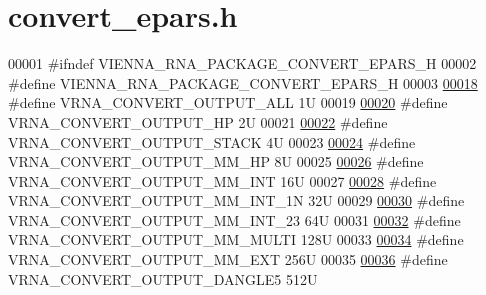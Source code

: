 \hypertarget{convert__epars_8h_source}{\section{convert\+\_\+epars.\+h}
\label{convert__epars_8h_source}
}

\begin{DoxyCode}
00001 \textcolor{preprocessor}{#ifndef VIENNA\_RNA\_PACKAGE\_CONVERT\_EPARS\_H}
00002 \textcolor{preprocessor}{#define VIENNA\_RNA\_PACKAGE\_CONVERT\_EPARS\_H}
00003 
\hypertarget{convert__epars_8h_source_l00018}{}\hyperlink{group__energy__parameters__convert_ga8dc6aee5a806c49b71557152f9616bc4}{00018} \textcolor{preprocessor}{#define VRNA\_CONVERT\_OUTPUT\_ALL           1U}
00019 
\hypertarget{convert__epars_8h_source_l00020}{}\hyperlink{group__energy__parameters__convert_gaf66fe2cb11dfcfd32d791049c254a8a4}{00020} \textcolor{preprocessor}{#define VRNA\_CONVERT\_OUTPUT\_HP            2U}
00021 
\hypertarget{convert__epars_8h_source_l00022}{}\hyperlink{group__energy__parameters__convert_gad23522d63f8d4c50d5a5deee9bee3ef2}{00022} \textcolor{preprocessor}{#define VRNA\_CONVERT\_OUTPUT\_STACK         4U}
00023 
\hypertarget{convert__epars_8h_source_l00024}{}\hyperlink{group__energy__parameters__convert_gaa892c7b4957459090f3e08da298cc347}{00024} \textcolor{preprocessor}{#define VRNA\_CONVERT\_OUTPUT\_MM\_HP         8U}
00025 
\hypertarget{convert__epars_8h_source_l00026}{}\hyperlink{group__energy__parameters__convert_ga4ff223fb1f9c62cd92d9ab811ad03d55}{00026} \textcolor{preprocessor}{#define VRNA\_CONVERT\_OUTPUT\_MM\_INT        16U}
00027 
\hypertarget{convert__epars_8h_source_l00028}{}\hyperlink{group__energy__parameters__convert_gaf5d3743219f83c6348155cd81e755bbb}{00028} \textcolor{preprocessor}{#define VRNA\_CONVERT\_OUTPUT\_MM\_INT\_1N     32U}
00029 
\hypertarget{convert__epars_8h_source_l00030}{}\hyperlink{group__energy__parameters__convert_ga78382ec622ba99e0ac2262317bdd7316}{00030} \textcolor{preprocessor}{#define VRNA\_CONVERT\_OUTPUT\_MM\_INT\_23     64U}
00031 
\hypertarget{convert__epars_8h_source_l00032}{}\hyperlink{group__energy__parameters__convert_gae67af9f1cdf7baf2865481282a5d1034}{00032} \textcolor{preprocessor}{#define VRNA\_CONVERT\_OUTPUT\_MM\_MULTI      128U}
00033 
\hypertarget{convert__epars_8h_source_l00034}{}\hyperlink{group__energy__parameters__convert_gaf14ead7ef1fdbe725ade653750fc51e3}{00034} \textcolor{preprocessor}{#define VRNA\_CONVERT\_OUTPUT\_MM\_EXT        256U}
00035 
\hypertarget{convert__epars_8h_source_l00036}{}\hyperlink{group__energy__parameters__convert_ga036ffd996d8c8a9acf631760dd1da24b}{00036} \textcolor{preprocessor}{#define VRNA\_CONVERT\_OUTPUT\_DANGLE5       512U}

\end{DoxyCode}

